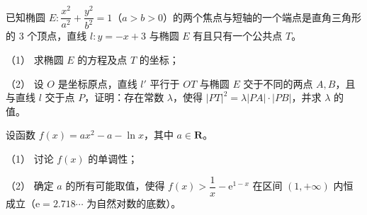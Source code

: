 \begin{question}
已知椭圆 \(E:\dfrac{x^{2}}{a^{2}}+\dfrac{y^{2}}{b^{2}}=1\)（\(a>b>0\)）的两个焦点与短轴的一个端点是直角三角形的 \(3\) 个顶点，直线 \(l:y=-x+3\) 与椭圆 \(E\) 有且只有一个公共点 \(T\)。

（1） 求椭圆 \(E\) 的方程及点 \(T\) 的坐标；

（2） 设 \(O\) 是坐标原点，直线 \(l'\) 平行于 \(OT\) 与椭圆 \(E\) 交于不同的两点 \(A,B\)，且与直线 \(l\) 交于点 \(P\)，证明：存在常数 \(\lambda\)，使得 \(|PT|^{2}=\lambda|PA|\cdot|PB|\)，并求 \(\lambda\) 的值。

\end{question}
\begin{question}
设函数 \(f(x)=ax^{2}-a-\ln x\)，其中 \(a\in\mathbf{R}\)。

（1） 讨论 \(f(x)\) 的单调性；

（2） 确定 \(a\) 的所有可能取值，使得 \(f(x)>\dfrac{1}{x}-\mathrm{e}^{1-x}\) 在区间 \((1,+\infty)\) 内恒成立（\(\mathrm{e}=2.718\cdots\) 为自然对数的底数）。

\end{question}